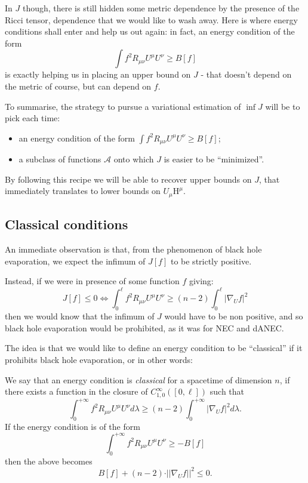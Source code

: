 	In \(J\) though, there is still hidden some metric dependence by the presence of the Ricci tensor, dependence that we would like to wash away. Here is where energy conditions shall enter and help us out again: in fact, an energy condition of the form 
	\[
	\int f^2 R_{\mu\nu}U^{\mu}U^{\nu} \ge B[f]	
	\]
	is exactly helping us in placing an upper bound on \(J\) - that doesn't depend on the metric of course, but can depend on \(f\).

	To summarise, the strategy to pursue a variational estimation of \(\inf J\) will be to pick each time:
	\begin{itemize}
		\item[\ding{99}] an energy condition of the form \(\int f^2 R_{\mu\nu}U^{\mu}U^{\nu} \ge B[f]\);
		\item[\ding{99}] a subclass of functions \(\mathcal{A}\) onto which \(J\) is easier to be ``minimized''.
	\end{itemize}
	By following this recipe we will be able to recover upper bounds on \(J\), that immediately translates to lower bounds on \(U_{\mu}\mathrm{H}^{\mu}\).

	\subsection{Classical conditions}
	An immediate observation is that, from the phenomenon of black hole evaporation, we expect the infimum of \(J[f]\) to be strictly positive.

	Instead, if we were in presence of some function \(f\) giving:
	\[
	J[f] \le 0	\iff \int_0^{\ell} f^2 R_{\mu\nu}U^{\mu}U^{\nu} \ge (n - 2)\int_0^{\ell} \vert \nabla_U f\vert^2
	\]
	then we would know that the infimum of \(J\) would have to be non positive, and so black hole evaporation would be prohibited, as it was for NEC and dANEC.

	The idea is that we would like to define an energy condition to be ``classical'' if it prohibits black hole evaporation, or in other words:
	\begin{definition}
		\label{def:classical-energy-condition}
		We say that an energy condition is \emph{classical} for a spacetime of dimension \(n\), if there exists a function in the closure of \(C_{1,0}^{\infty}\left([0, \ell]\right)\) such that
		\[
			\int_0^{+\infty} f^2 R_{\mu\nu}U^{\mu}U^{\nu} d\lambda\ge (n - 2) \int_0^{+\infty} \vert \nabla_U f\vert^2 d\lambda.	
		\]
		If the energy condition is of the form
		\[
			\int_0^{+\infty} f^2 R_{\mu\nu}U^{\mu}U^{\nu} \ge -B[f]	
		\]
		then the above becomes
		\begin{equation}
			\label{eq:definition-classical-condition}
			B[f] + (n - 2) \cdot \vert\vert \nabla_U f \vert\vert^2 \le 0.
		\end{equation}
	\end{definition}

